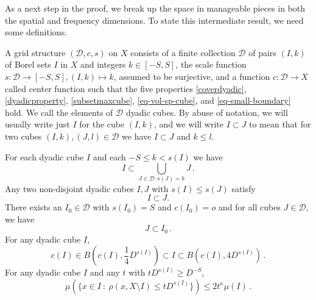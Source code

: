 \documentclass[12pt]{amsart}
\theoremstyle{definition}
\theoremstyle{plain}
\begin{document}
As a next step in the proof, we break up the space in manageable pieces in both the spatial and frequency dimensions.
To state this intermediate result, we need some definitions.


A grid structure $(\mathcal{D}, c, s)$ on $X$ consists of a finite collection $\mathcal{D}$ of pairs $(I, k)$ of Borel
sets $I$ in $X$ and integers $k \in [-S, S]$, the scale function $s\colon \mathcal{D}\to [-S, S], (I, k) \mapsto k$, assumed to be surjective, and a function $c:\mathcal{D}\to X$
called center function such that the five properties
\eqref{coverdyadic}, \eqref{dyadicproperty}, \eqref{subsetmaxcube},
\eqref{eq-vol-sp-cube}, and \eqref{eq-small-boundary} hold. We call the elements of $\mathcal{D}$ dyadic cubes. By abuse of notation, we will usually write just $I$ for the cube $(I,k)$, and we will write $I \subset J$ to mean that for two cubes $(I,k), (J, l) \in \mathcal{D}$ we have $I \subset J$ and $k \le l$.

For each dyadic cube $I$ and each $-S\le k<s(I)$ we have
\begin{equation}\label{coverdyadic}
    I\subset \bigcup_{J\in \mathcal {D}: s(J)=k}J\, .
\end{equation}
Any two non-disjoint dyadic cubes $I,J$ with $s(I)\le s(J)$ satisfy
\begin{equation}\label{dyadicproperty}
    I\subset J.
\end{equation}
There exists an $I_0 \in \mathcal{D}$ with $s(I_0) = S$ and $c(I_0) = o$
and for all cubes $J \in \mathcal{D}$, we have
\begin{equation}\label{subsetmaxcube}
    J \subset I_0\,.
\end{equation}
For any dyadic cube $I$,
\begin{equation}
    \label{eq-vol-sp-cube}
    c(I)\in B(c(I), \frac{1}{4} D^{s(I)}) \subset I \subset B(c(I), 4 D^{s(I)})\,.
\end{equation}
For any dyadic cube $I$ and any $t$ with $tD^{s(I)} \ge D^{-S}$,
\begin{equation}
    \label{eq-small-boundary}
    \mu(\{x \in I \ : \ \rho(x, X \setminus I) \leq t D^{s(I)}\}) \le 2 t^\kappa \mu(I)\,.
\end{equation}
\end{document}
